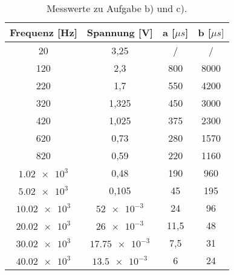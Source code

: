 \begin{table}
    \centering
    \caption{Messwerte zu Aufgabe b) und c).}
    \label{tab:a)}

    \begin{tabular}{c c c c}
    \toprule
    Frequenz [Hz]& Spannung [V] & a [$\mu s$]& b [$\mu s]$ \\
    \midrule
    20               & 3,25             & /    & /    \\    
    120              & 2,3              & 800  & 8000 \\    
    220              & 1,7              & 550  & 4200 \\    
    320              & 1,325            & 450  & 3000 \\    
    420              & 1,025            & 375  & 2300 \\    
    620              & 0,73             & 280  & 1570 \\    
    820              & 0,59             & 220  & 1160 \\    
    $\num{1.02 e3}$  & 0,48             & 190  & 960  \\    
    $\num{5.02 e3}$  & 0,105            & 45   & 195  \\    
    $\num{10.02e3}$  & $\num{52 e-3}$   & 24   & 96   \\    
    $\num{20.02e3}$  & $\num{26 e-3}$   & 11,5 & 48   \\    
    $\num{30.02e3}$  & $\num{17.75e-3}$ & 7,5  & 31   \\    
    $\num{40.02e3}$  & $\num{13.5 e-3}$ & 6    & 24   \\            
    \bottomrule

    \end{tabular}
\end{table}